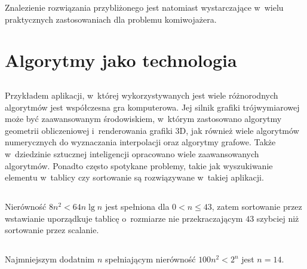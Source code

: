 Znalezienie rozwiązania przybliżonego jest natomiast wystarczające w~wielu praktycznych zastosowaniach dla problemu komiwojażera.

\section{Algorytmy jako technologia}

\subsection{} %
Przykładem aplikacji, w~której wykorzystywanych jest wiele różnorodnych algorytmów jest współczesna gra komputerowa. Jej silnik grafiki trójwymiarowej może być zaawansowanym środowiskiem, w~którym zastosowano algorytmy geometrii obliczeniowej i~renderowania grafiki 3D, jak również wiele algorytmów numerycznych do wyznaczania interpolacji oraz algorytmy grafowe. Także w~dziedzinie sztucznej inteligencji opracowano wiele zaawansowanych algorytmów. Ponadto często spotykane problemy, takie jak wyszukiwanie elementu w~tablicy czy sortowanie są rozwiązywane w~takiej aplikacji.

\subsection{} %
Nierówność $8n^2 < 64n\lg n$ jest spełniona dla $0<n\le 43$, zatem sortowanie przez wstawianie uporządkuje tablicę o~rozmiarze nie przekraczającym $43$ szybciej niż sortowanie przez scalanie.

\subsection{} %
Najmniejszym dodatnim $n$ spełniającym nierówność $100n^2 < 2^n$ jest $n=14$.

\problems

\subsection{} %

